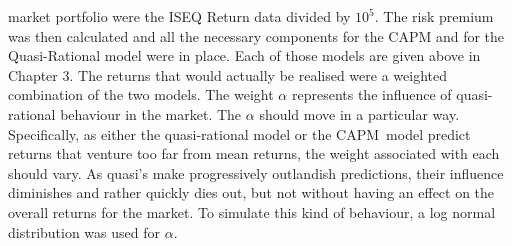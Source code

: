 \documentclass{ucthesis}
\begin{document}
market portfolio were the ISEQ Return data divided by $10^{5}$. The risk premium was then calculated and all
the necessary components for the CAPM and for the Quasi-Rational model were
in place. Each of those models are given above in Chapter 3. The returns
that would actually be realised were a weighted combination of the two
models. The weight $\alpha $ represents the influence of quasi-rational
behaviour in the market. The $\alpha $ should move in a particular way.
Specifically, as either the quasi-rational model or the CAPM\ model predict
returns that venture too far from mean returns, the weight associated with
each should vary. As quasi's make progressively outlandish predictions,
their influence diminishes and rather quickly dies out, but not without
having an effect on the overall returns for the market. To simulate this
kind of behaviour, a log normal distribution was used for $\alpha $.
\end{document}

